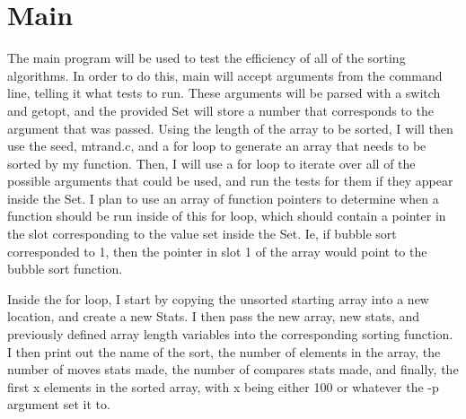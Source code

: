 \documentclass[11pt]{article}
\begin{document}
\section{Main}

The main program will be used to test the efficiency of all of the sorting algorithms. In order to do this, main will accept arguments from the command line, telling it what tests to run. These arguments will be parsed with a switch and getopt, and the provided Set will store a number that corresponds to the argument that was passed. Using the length of the array to be sorted, I will then use the seed, mtrand.c, and a for loop to generate an array that needs to be sorted by my function. Then, I will use a for loop to iterate over all of the possible arguments that could be used, and run the tests for them if they appear inside the Set. I plan to use an array of function pointers to determine when a function should be run inside of this for loop, which should contain a pointer in the slot corresponding to the value set inside the Set. Ie, if bubble sort corresponded to 1, then the pointer in slot 1 of the array would point to the bubble sort function.

Inside the for loop, I start by copying the unsorted starting array into a new location, and create a new Stats. I then pass the new array, new stats, and previously defined array length variables into the corresponding sorting function. I then print out the name of the sort, the number of elements in the array, the number of moves stats made, the number of compares stats made, and finally, the first x elements in the sorted array, with x being either 100 or whatever the -p argument set it to.
\end{document}

